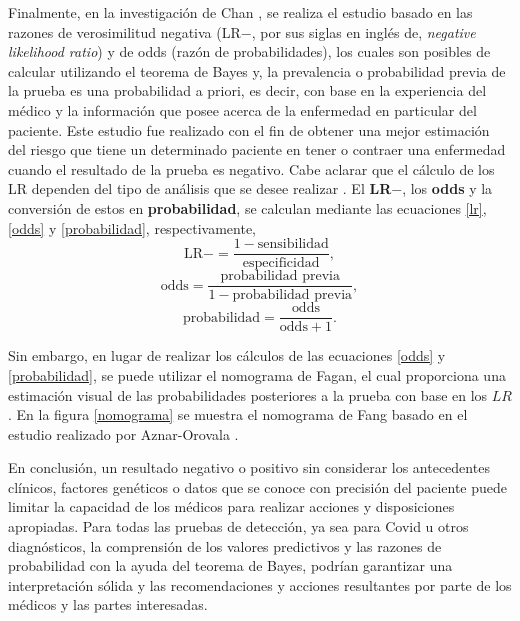 \documentclass{article}
\begin{document}
Finalmente, en la investigación de Chan \cite{link5}, se realiza el estudio basado en las razones de verosimilitud negativa (LR$-$, por sus siglas en inglés de, \textit{negative likelihood ratio}) y de odds (razón de probabilidades), los cuales son posibles de calcular utilizando el teorema de Bayes y, la prevalencia o probabilidad previa de la prueba es una probabilidad a priori, es decir, con base en la experiencia del médico y la información que posee acerca de la enfermedad en particular del paciente. Este estudio fue realizado con el fin de obtener una mejor estimación del riesgo que tiene un determinado paciente en tener o contraer una enfermedad cuando el resultado de la prueba es negativo. Cabe aclarar que el cálculo de los LR dependen del tipo de análisis que se desee realizar \cite{bayes}. El \textbf{LR$-$}, los \textbf{odds} y la conversión de estos en \textbf{probabilidad}, se calculan mediante las ecuaciones \ref{lr}, \ref{odds} y \ref{probabilidad}, respectivamente,
\begin{equation}
\text{LR}-= \frac{1- \text{sensibilidad}}{\text{especificidad}},
\label{lr}
\end{equation}
\begin{equation}
\text{odds}= \frac{\text{probabilidad previa}}{1-\text{probabilidad previa}},
\label{odds}
\end{equation}
\begin{equation}
\text{probabilidad}= \frac{\text{odds}}{\text{odds}+1}.
\label{probabilidad}
\end{equation}

Sin embargo, en lugar de realizar los cálculos de las ecuaciones \ref{odds} y \ref{probabilidad}, se puede utilizar el nomograma de Fagan, el cual proporciona una estimación visual de las probabilidades posteriores a la prueba con base en los $LR$. En la figura \ref{nomograma} se muestra el nomograma de Fang basado en el estudio realizado por Aznar-Orovala \cite{nomograma}.

En conclusión, un resultado negativo o positivo sin considerar los antecedentes clínicos, factores genéticos o datos que se conoce con precisión del paciente puede limitar la capacidad de los médicos para realizar acciones y disposiciones apropiadas. Para todas las pruebas de detección, ya sea para Covid u otros diagnósticos, la comprensión de los valores predictivos y las razones de probabilidad con la ayuda del teorema de Bayes, podrían garantizar una interpretación sólida y las recomendaciones y acciones resultantes por parte de los médicos y las partes interesadas.
\end{document}
